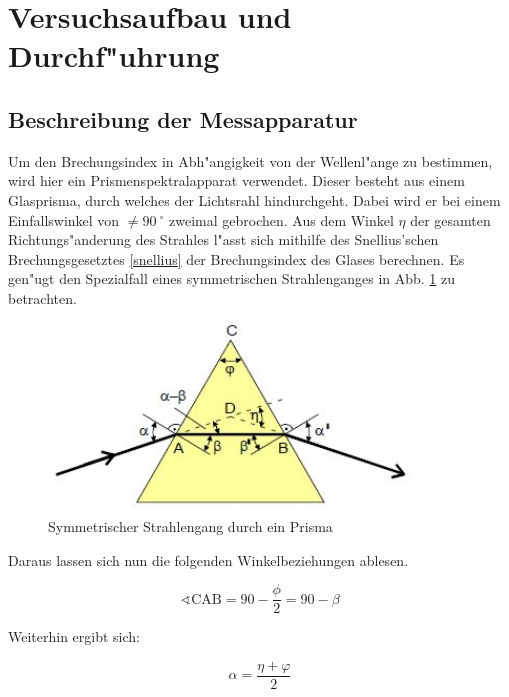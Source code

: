 \section{Versuchsaufbau und Durchf"uhrung} %
\label{sec:durchfuehrung}

	\subsection{Beschreibung der Messapparatur} %
	\label{sub:beschreibung_der_messapparatur}
	
	Um den Brechungsindex in Abh"angigkeit von der Wellenl"ange zu bestimmen, wird hier ein Prismenspektralapparat verwendet. Dieser besteht aus einem Glasprisma, durch welches der Lichtsrahl hindurchgeht. Dabei wird er bei einem Einfallswinkel von $\neq \SI{90}{^\circ}$ zweimal gebrochen. Aus dem Winkel $\eta$  der gesamten Richtungs"anderung des Strahles l"asst sich mithilfe des Snellius'schen Brechungsgesetztes \ref{snellius} der Brechungsindex des Glases berechnen. Es gen"ugt den Spezialfall eines symmetrischen Strahlenganges in Abb. \ref{symmetrisch} zu betrachten. 

	\begin{figure}[!h]
		\centering
		\includegraphics[width = 10cm]{img/symmetrisch.JPG}
		\caption{Symmetrischer Strahlengang durch ein Prisma \cite{anleitung}}
		\label{symmetrisch}
	\end{figure}

	Daraus lassen sich nun die folgenden Winkelbeziehungen ablesen.

	\begin{equation}
		\sphericalangle\mathrm{CAB} = 90 -\frac{\phi}{2} = 90 - \beta
	\end{equation}

	Weiterhin ergibt sich:

	\begin{equation}
		\alpha = \frac{\eta + \varphi}{2}
	\end{equation}

